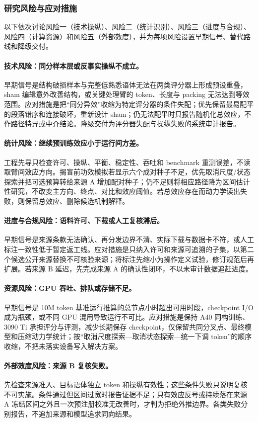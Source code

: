 \subsubsection{研究风险与应对措施}

以下依次讨论风险一（技术操纵）、风险二（统计识别）、风险三（进度与合规）、风险四（计算资源）和风险五（外部效度），并为每项风险设置早期信号、替代路线和降级交付。

\paragraph{技术风险：同分样本层或反事实操纵不成立。}早期信号是结构破损样本与完整低熟悉语体无法在两类评分器上形成预设重叠，sham 编辑意外改善结构，或关键处理臂的 token、长度与 packing 无法达到等效范围。应对措施是把“同分异效”收缩为特定评分器的条件失配；优先保留最易配平的段落错序和连接破坏，重新设计 sham；仍无法配平时只报告随机化总效应，不作路径特异或中介结论。降级交付为评分器失配与操纵失败的系统审计报告。

\paragraph{统计风险：继续预训练效应小于运行间方差。}工程先导只检查许可、操纵、平衡、稳定性、吞吐和 benchmark 重测误差，不读取臂间效应方向。揭盲前功效模拟若显示六个成对种子不足，优先取消尺度/状态探索并把可选预算转给来源 A 增加配对种子；仍不足则将相应路径降为区间估计性研究，不改变主方向、终点、对比和效应阈值。若总效应存在而动力学读出失败，则保留总效应、删除候选机制解释。

\paragraph{进度与合规风险：语料许可、下载或人工复核滞后。}早期信号是来源条款无法确认、再分发边界不清、实际下载与数据卡不符，或人工标注一致性低于暂定返工线。应对措施是只纳入许可和来源可追溯的子集，以第二个候选公开来源替换不可核验来源；将标注先缩小为操作定义试验，修订规范后再扩展。若来源 B 延迟，先完成来源 A 的确认性闭环，不以未审计数据追赶进度。

\paragraph{资源风险：GPU 吞吐、排队或存储不足。}早期信号是 10M token 基准运行推算的总节点小时超出可用时段，checkpoint I/O 成为瓶颈，或不同 GPU 混用导致运行不可比。应对措施是保持 A40 同构训练、3090 Ti 承担评分与评测，减少长期保存 checkpoint，仅保留共同分叉点、最终模型和压缩动力学统计；按“取消尺度探索—取消状态探索—统一下调 token”的顺序收缩，不把未落实设备写入解决方案。

\paragraph{外部效度风险：来源 B 复核失败。}先检查来源准入、目标语体独立 token 和操纵有效性；这些条件失败只说明复核不可实施。条件通过但区间过宽时报告证据不足；只有效应反号或持续落在来源 A 冻结区间之外且一次预注册校准无改善时，才判为拒绝外推边界。各类失败分别报告，不追加来源和模型追求同向结果。
